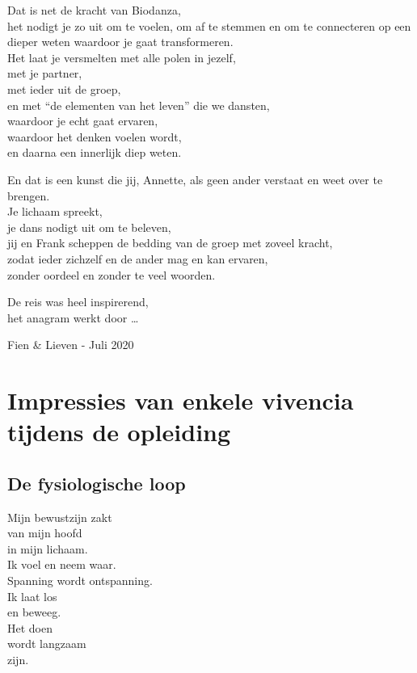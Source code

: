 \documentclass[
  11pt,
]{book}
\begin{document}
Dat is net de kracht van Biodanza,\\
het nodigt je zo uit om te voelen, om af te stemmen en om te connecteren op een dieper weten waardoor je gaat transformeren.\\
Het laat je versmelten met alle polen in jezelf,\\
met je partner,\\
met ieder uit de groep,\\
en met ``de elementen van het leven'' die we dansten,\\
waardoor je echt gaat ervaren,\\
waardoor het denken voelen wordt,\\
en daarna een innerlijk diep weten.

En dat is een kunst die jij, Annette, als geen ander verstaat en weet over te brengen.\\
Je lichaam spreekt,\\
je dans nodigt uit om te beleven,\\
jij en Frank scheppen de bedding van de groep met zoveel kracht,\\
zodat ieder zichzelf en de ander mag en kan ervaren,\\
zonder oordeel en zonder te veel woorden.

De reis was heel inspirerend,\\
het anagram werkt door \ldots{}

Fien \& Lieven - Juli 2020

\hypertarget{impressies-van-enkele-vivencia-tijdens-de-opleiding}{%
\section*{Impressies van enkele vivencia tijdens de opleiding}\label{impressies-van-enkele-vivencia-tijdens-de-opleiding}}

\hypertarget{de-fysiologische-loop}{%
\subsection*{De fysiologische loop}\label{de-fysiologische-loop}}

Mijn bewustzijn zakt\\
van mijn hoofd\\
in mijn lichaam.\\
Ik voel en neem waar.\\
Spanning wordt ontspanning.\\
Ik laat los\\
en beweeg.\\
Het doen\\
wordt langzaam\\
zijn.
\end{document}
